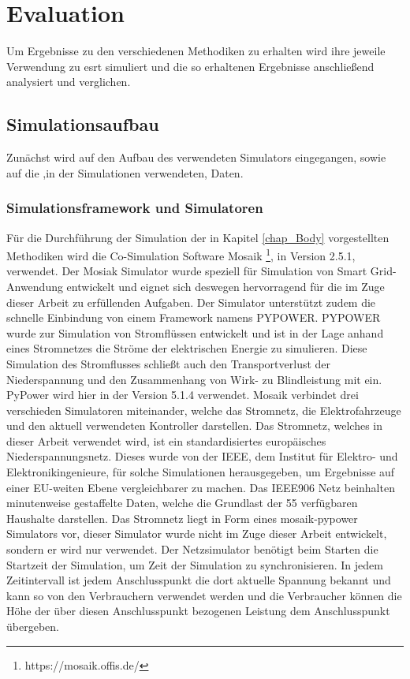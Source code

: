 \chapter{Evaluation}
Um Ergebnisse zu den verschiedenen Methodiken zu erhalten wird ihre jeweile Verwendung zu esrt simuliert und die so erhaltenen Ergebnisse anschließend analysiert und verglichen.
\section{Simulationsaufbau}
Zunächst wird auf den Aufbau des verwendeten Simulators eingegangen, sowie auf die ,in der Simulationen verwendeten, Daten.
\subsection{Simulationsframework und Simulatoren}
Für die Durchführung der Simulation der in Kapitel \ref{chap_Body} vorgestellten Methodiken wird die Co-Simulation Software Mosaik \footnote{https://mosaik.offis.de/}, in Version 2.5.1, verwendet. Der Mosiak Simulator wurde speziell für Simulation von Smart Grid-Anwendung entwickelt und eignet sich deswegen hervorragend für die im Zuge dieser Arbeit zu erfüllenden Aufgaben. Der Simulator unterstützt zudem die schnelle Einbindung von einem Framework namens PYPOWER. PYPOWER wurde zur Simulation von Stromflüssen entwickelt und ist in der Lage anhand eines Stromnetzes die Ströme der elektrischen Energie zu simulieren. Diese Simulation des Stromflusses schließt auch den Transportverlust der Niederspannung und den Zusammenhang von Wirk- zu Blindleistung mit ein. PyPower wird hier in der Version 5.1.4 verwendet. Mosaik verbindet drei verschieden Simulatoren miteinander, welche das Stromnetz, die Elektrofahrzeuge und den aktuell verwendeten Kontroller darstellen.
Das Stromnetz, welches in dieser Arbeit verwendet wird, ist ein standardisiertes europäisches Niederspannungsnetz.  Dieses wurde von der IEEE, dem Institut für Elektro- und Elektronikingenieure, für solche Simulationen herausgegeben, um Ergebnisse auf einer EU-weiten Ebene vergleichbarer zu machen. Das IEEE906 Netz beinhalten minutenweise gestaffelte Daten, welche die Grundlast der 55 verfügbaren Haushalte darstellen. Das Stromnetz liegt in Form eines mosaik-pypower Simulators vor, dieser Simulator wurde nicht im Zuge dieser Arbeit entwickelt, sondern er wird nur verwendet. Der Netzsimulator benötigt beim Starten die Startzeit der Simulation, um Zeit der Simulation zu synchronisieren. In jedem Zeitintervall ist jedem Anschlusspunkt die dort aktuelle Spannung bekannt und kann so von den Verbrauchern verwendet werden und die Verbraucher können die Höhe der über diesen Anschlusspunkt bezogenen Leistung dem Anschlusspunkt übergeben.
